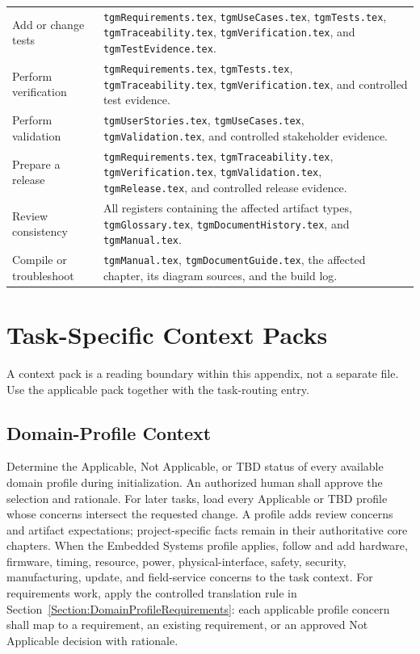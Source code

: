 \begin{tabularx}{\linewidth}{L{4.0cm}Y}
Add or change tests & \texttt{tgmRequirements.tex}, \texttt{tgmUseCases.tex}, \texttt{tgmTests.tex}, \texttt{tgmTraceability.tex}, \texttt{tgmVerification.tex}, and \texttt{tgmTestEvidence.tex}.\\
Perform verification & \texttt{tgmRequirements.tex}, \texttt{tgmTests.tex}, \texttt{tgmTraceability.tex}, \texttt{tgmVerification.tex}, and controlled test evidence.\\
Perform validation & \texttt{tgmUserStories.tex}, \texttt{tgmUseCases.tex}, \texttt{tgmValidation.tex}, and controlled stakeholder evidence.\\
Prepare a release & \texttt{tgmRequirements.tex}, \texttt{tgmTraceability.tex}, \texttt{tgmVerification.tex}, \texttt{tgmValidation.tex}, \texttt{tgmRelease.tex}, and controlled release evidence.\\
Review consistency & All registers containing the affected artifact types, \texttt{tgmGlossary.tex}, \texttt{tgmDocumentHistory.tex}, and \texttt{tgmManual.tex}.\\
Compile or troubleshoot & \texttt{tgmManual.tex}, \texttt{tgmDocumentGuide.tex}, the affected chapter, its diagram sources, and the build log.\\
\end{tabularx}
\normalsize

\section{Task-Specific Context Packs}
A context pack is a reading boundary within this appendix, not a separate file.
Use the applicable pack together with the task-routing entry.

\subsection{Domain-Profile Context}
Determine the Applicable, Not Applicable, or TBD status of every available
domain profile during initialization. An authorized human shall approve the
selection and rationale. For later tasks, load every Applicable or TBD profile
whose concerns intersect the requested change. A profile adds review concerns
and artifact expectations; project-specific facts remain in their authoritative
core chapters. When the Embedded Systems profile applies, follow
 and add hardware, firmware, timing,
resource, power, physical-interface, safety, security, manufacturing, update,
and field-service concerns to the task context. For requirements work, apply
the controlled translation rule in
Section~\ref{Section:DomainProfileRequirements}: each applicable profile
concern shall map to a requirement, an existing requirement, or an approved
Not Applicable decision with rationale.

